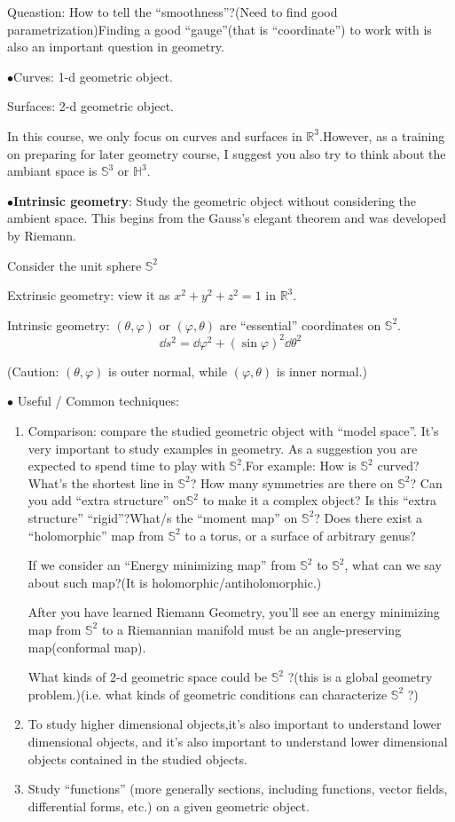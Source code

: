 Queastion: How to tell the ``smoothness''?(Need to find good parametrization)Finding a good ``gauge''(that is ``coordinate'') to work with is also an important question in geometry.

$\bullet$Curves: 1-d geometric object.

Surfaces: 2-d geometric object.
\begin{remark}
    In this course, we only focus on curves and surfaces in $\mathbb{R}^3$.However, as a training on preparing for later geometry course, I suggest you also try to think about the ambiant space is $\mathbb{S}^3$ or $\mathbb{H}^3$.

\end{remark}
$\bullet$\textbf{Intrinsic geometry}: Study the geometric object without considering the ambient space. This begins from the Gauss's elegant theorem and was developed by Riemann.
\begin{example}
    Consider the unit sphere $\mathbb{S}^2$

    Extrinsic geometry: view it as $x^2+y^2+z^2=1$ in $\mathbb{R}^3$.

    Intrinsic geometry: $(\theta,\varphi)$ or $(\varphi,\theta)$ are ``essential'' coordinates on $\mathbb{S}^2$. \[
        \dd s^2=\dd \varphi^2+(\sin\varphi)^2 \dd\theta^2
    \]

    (Caution: $(\theta,\varphi)$ is outer normal, while $(\varphi,\theta)$ is inner normal.)
\end{example}
$\bullet$ Useful / Common techniques:
\begin{enumerate}[1)]
    \item Comparison: compare the studied geometric object with ``model space''. It's very important to study examples in geometry. As a suggestion you are expected to spend time to play with $\mathbb{S}^2$.For example: How is $\mathbb{S}^2$ curved? What's the shortest line in $\mathbb{S}^2$? How many symmetries are there on $\mathbb{S}^2$? Can you add ``extra structure'' on$\mathbb{S}^2$ to make it a complex object? Is this ``extra structure'' ``rigid''?What/s the ``moment map'' on $\mathbb{S}^2$? Does there exist a ``holomorphic'' map from $\mathbb{S}^2$ to a torus, or a surface of arbitrary genus? 
 
    If we consider an ``Energy minimizing map'' from $\mathbb{S}^2$ to $\mathbb{S}^2$, what can we say about such map?(It is  holomorphic/antiholomorphic.)
 
    After you have learned Riemann Geometry, you'll see an energy minimizing map from $\mathbb{S}^2$ to a Riemannian manifold must be an angle-preserving map(conformal map).
 
    What kinds of 2-d geometric space could be $\mathbb{S}^2$ ?(this is a global geometry problem.)(i.e. what kinds of geometric conditions can characterize $\mathbb{S}^2$ ?)
    \item To study higher dimensional objects,it's also important to understand lower dimensional objects, and it's also important to understand lower dimensional objects contained in the studied objects.
    \item Study ``functions'' (more generally sections, including functions, vector fields, differential forms, etc.) on a given geometric object.
\end{enumerate}
